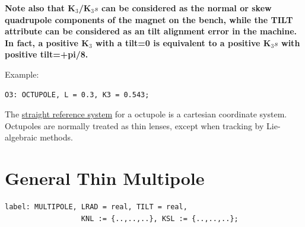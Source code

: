 \textbf{  Note also that K$_3$/K$_3s$ can be considered as the normal or
  skew quadrupole components of the magnet on the bench, while the TILT
  attribute can be considered as an tilt alignment error in the
  machine. In fact, a positive K$_3$ with a tilt=0 is equivalent to a
  positive K$_3s$ with positive tilt=+pi/8. } 

Example: 
\begin{verbatim}
O3: OCTUPOLE, L = 0.3, K3 = 0.543;
\end{verbatim} 

The \href{local_system.html#straight}{straight reference system} for a
octupole is a cartesian coordinate system. Octupoles are normally
treated as thin lenses, except when tracking by Lie-algebraic methods.   



%
\section{General Thin Multipole}
\label{sec:multipole}

\begin{verbatim}
label: MULTIPOLE, LRAD = real, TILT = real,
                  KNL := {..,..,..}, KSL := {..,..,..};
\end{verbatim} 

